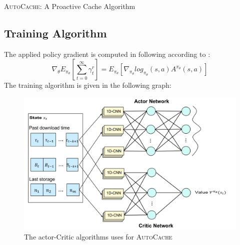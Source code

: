 \documentclass{article}
\begin{document}
\begin{section}{\textsc{AutoCache}: A Proactive Cache Algorithm}
    \subsection{Training Algorithm}
    The applied policy gradient is computed in following according to \cite{a3c}:
    $$
    \nabla_\theta E_{\pi_\theta}[\sum_{t=0}^{\infty} \gamma^ r_t] = E_{\pi_\theta} [\nabla_{\pi_\theta} log_{\pi_\theta}(s,a) A^{\pi_\theta}(s,a)]
    $$
    The training algorithm is given in the following graph:

    \begin{figure}[h]
        \label{fig:a3c}
        \centering
        \includegraphics[width=0.8\linewidth]{a3c-network.png}
        \caption{The actor-Critic algorithms uses for \textsc{AutoCache}}
    \end{figure}
    
\end{section}
\end{document}
